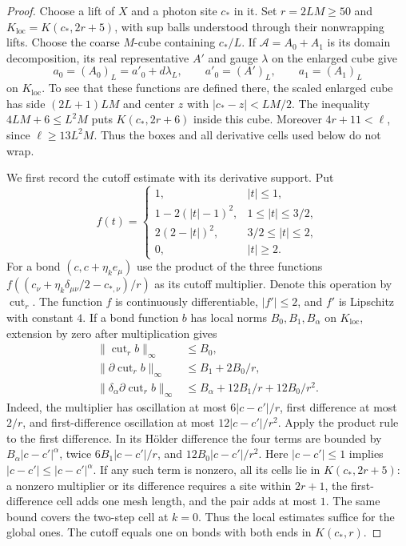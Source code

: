 \begin{proof}
Choose a lift of $X$ and a photon site $c_*$ in it.
Set $r=2LM\ge50$ and $K_{\mathrm{loc}}=K(c_*,2r+5)$, with
sup balls understood through their nonwrapping lifts.
Choose the coarse $M$-cube containing $c_*/L$.
If $\mathscr A=A_0+A_1$ is its domain decomposition, its
real representative $A'$ and gauge $\lambda$ on the
enlarged cube give
\[
 a_0=(A_0)_L=a'_0+d\lambda_L,\qquad
 a'_0=(A')_L,\qquad a_1=(A_1)_L
\]
on $K_{\mathrm{loc}}$. To see that these functions are
defined there, the scaled enlarged cube has side
$(2L+1)LM$ and center $z$ with $|c_*-z|<LM/2$.
The inequality $4LM+6\le L^2M$ puts
$K(c_*,2r+6)$ inside this cube. Moreover
$4r+11<\ell$, since $\ell\ge13L^2M$.
Thus the boxes and all derivative cells used below do
not wrap.

We first record the cutoff estimate with its derivative
support. Put
\[
 f(t)=
 \begin{cases}
 1,&|t|\le1,\\
 1-2(|t|-1)^2,&1\le|t|\le3/2,\\
 2(2-|t|)^2,&3/2\le|t|\le2,\\
 0,&|t|\ge2.
 \end{cases}
\]
For a bond $(c,c+\eta_ke_\mu)$ use the product of the three
functions $f((c_\nu+\eta_k\delta_{\mu\nu}/2-c_{*,\nu})/r)$
as its cutoff multiplier. Denote this operation by
$\operatorname{cut}_r$. The function $f$ is continuously
differentiable, $|f'|\le2$, and $f'$ is Lipschitz with
constant $4$. If a bond function $b$ has local norms
$B_0,B_1,B_\alpha$ on $K_{\mathrm{loc}}$, extension by zero
after multiplication gives
\begin{equation}\label{eq:rg-cutoff-estimate}
 \begin{split}
 \|\operatorname{cut}_r b\|_\infty&\le B_0,\\
 \|\partial\operatorname{cut}_r b\|_\infty
                                      &\le B_1+2B_0/r,\\
 \|\delta_\alpha\partial\operatorname{cut}_r b\|_\infty
                             &\le B_\alpha+12B_1/r+12B_0/r^2.
 \end{split}
\end{equation}
Indeed, the multiplier has oscillation at most
$6|c-c'|/r$, first difference at most $2/r$, and
first-difference oscillation at most $12|c-c'|/r^2$.
Apply the product rule to the first difference.
In its H\"older difference the four terms are bounded
by $B_\alpha |c-c'|^\alpha$, twice
$6B_1|c-c'|/r$, and $12B_0|c-c'|/r^2$.
Here $|c-c'|\le1$ implies
$|c-c'|\le|c-c'|^\alpha$.
If any such term is nonzero, all its cells lie in
$K(c_*,2r+5)$: a nonzero multiplier or its difference
requires a site within $2r+1$, the first-difference
cell adds one mesh length, and the pair adds at most
$1$. The same bound covers the two-step cell at
$k=0$. Thus the local estimates suffice for the global
ones. The cutoff equals one on bonds with both ends in
$K(c_*,r)$.


\end{proof}
